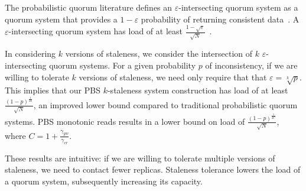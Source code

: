 \documentclass{vldb}
\begin{document}
The probabilistic quorum literature defines an
$\varepsilon$-intersecting quorum system as a quorum system that
provides a $1-\varepsilon$ probability of returning consistent
data~\cite[Definition 3.1]{prob-quorum}.  A $\varepsilon$-intersecting
quorum system has load of at least 
$\frac{1-\sqrt{\varepsilon}}{\sqrt{N}}$~\cite[Corollary
  3.12]{prob-quorum}.

In considering $k$ versions of staleness, we consider the intersection
of $k$ $\varepsilon$-intersecting quorum systems.  For a given
probability $p$ of inconsistency, if we are willing to tolerate $k$
versions of staleness, we need only require that that $\varepsilon =
\sqrt[k]{p}$.  This implies that our PBS $k$-staleness system
construction has load of at least
$\frac{(1-p)^{\frac{1}{2k}}}{\sqrt{N}}$, an improved lower bound
compared to traditional probabilistic quorum systems.  PBS monotonic
reads results in a lower bound on load of
$\frac{(1-p)^{\frac{1}{2C}}}{\sqrt{N}}$, where
$C=1+\frac{\gamma_{gw}}{\gamma_{cr}}$.

These results are intuitive: if we are willing to tolerate multiple
versions of staleness, we need to contact fewer replicas.  Staleness
tolerance lowers the load of a quorum system, subsequently increasing
its capacity.
\end{document}
